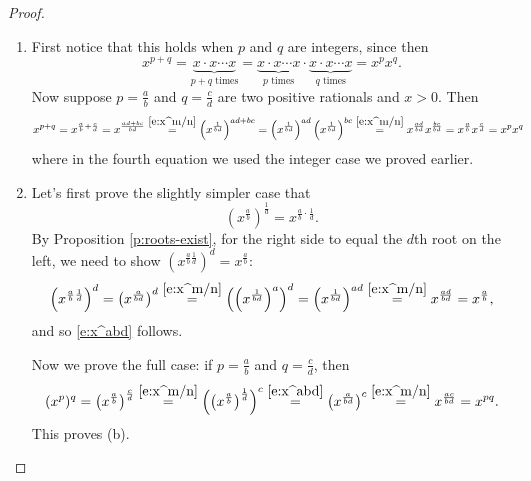 \documentclass[11pt,dvipsnames]{book}
\numberwithin{figure}{section} %
\numberwithin{table}{section} %
\begin{document}
\begin{proof}
\begin{enumerate}[label=(\alph*)]
\item First notice that this holds when $p$ and $q$ are integers, since then
\[
x^{p+q}=\underbrace{x\cdot x\cdots x}_{\mbox{$p+q$ times}}
=\underbrace{x\cdot x\cdots x}_{\mbox{$p$ times}}\cdot \underbrace{x\cdot x\cdots x}_{\mbox{$q$ times}} = x^{p}x^{q}.
\]
Now suppose $p=\frac{a}{b}$ and $q=\frac{c}{d}$ are two positive rationals and $x>0$. Then
\begin{align*}
x^{p+q}
& =x^{\frac{a}{b}+\frac{c}{d}}
=x^{\frac{ad+bc}{bd}}
\stackrel{\eqref{e:x^m/n}}{=} \left(x^{\frac{1}{bd}}\right)^{ad+bc}
=\left(x^{\frac{1}{bd}}\right)^{ad}\left(x^{\frac{1}{bd}}\right)^{bc}
\stackrel{\eqref{e:x^m/n}}{=}x^{\frac{ad}{bd}}x^{\frac{bc}{bd}}=x^{\frac{a}{b}}x^{\frac{c}{d}}=x^{p}x^{q}
\end{align*}
where in the fourth equation we used the integer case we proved earlier.
\item

Let's first prove the slightly simpler case that
\begin{equation}
\label{e:x^abd}
\left(x^{\frac{a}{b}}\right)^{\frac{1}{d}}=x^{\frac{a}{b}\cdot\frac{1}{d}}.
\end{equation}
By Proposition \ref{p:roots-exist}, for the right side to equal the $d$th root on the left, we need to show $(x^{\frac{a}{b}\frac{1}{d}})^{d} = x^{\frac{a}{b}}$:
\[
\left(x^{\frac{a}{b}\frac{1}{d}}\right)^{d} =\left(x^{\frac{a}{bd}}\right)^{d}
\stackrel{\eqref{e:x^m/n}}{=}
\left(\left(x^{\frac{1}{bd}}\right)^{a}\right)^{d}
=\left(x^{\frac{1}{bd}}\right)^{ad}
\stackrel{\eqref{e:x^m/n}}{=}x^{\frac{ad}{bd}}=x^{\frac{a}{b}},
\]
and so \eqref{e:x^abd} follows. 

Now we prove the full case: if $p=\frac{a}{b}$ and $q=\frac{c}{d}$, then
\[
(x^{p})^{q} = \left(x^{\frac{a}{b}}\right)^{\frac{c}{d}}
\stackrel{\eqref{e:x^m/n}}{=}\left( \left(x^{\frac{a}{b}}\right)^{\frac{1}{d}}\right)^{c}
\stackrel{\eqref{e:x^abd}}{=}\left(x^{\frac{a}{bd}}\right)^{c}
\stackrel{\eqref{e:x^m/n}}{=} x^{\frac{ac}{bd}}=x^{pq}.
\]
This proves (b). 


\end{enumerate}
\end{proof}
\end{document}
